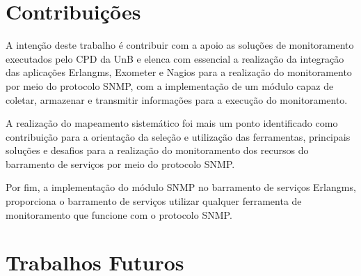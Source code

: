 \section{Contribuições}

A intenção deste trabalho é contribuir com a apoio as soluções de monitoramento executados pelo \acrshort{CPD} da \acrshort{UnB} e elenca com essencial a realização da integração das aplicações Erlangms, Exometer e Nagios\textsuperscript{\textregistered} para a realização do monitoramento por meio do protocolo \acrshort{SNMP}, com a implementação de um módulo capaz de coletar, armazenar e transmitir informações para a execução do monitoramento.

A realização do mapeamento sistemático foi mais um ponto identificado como contribuição para a orientação da seleção e utilização das ferramentas, principais soluções e desafios para a realização do monitoramento dos recursos do barramento de serviços por meio do protocolo \acrshort{SNMP}.

Por fim, a implementação do módulo \acrshort{SNMP} no barramento de serviços Erlangms, proporciona o barramento de serviços utilizar qualquer ferramenta de monitoramento que funcione com o protocolo \acrshort{SNMP}.




\section{Trabalhos Futuros}





